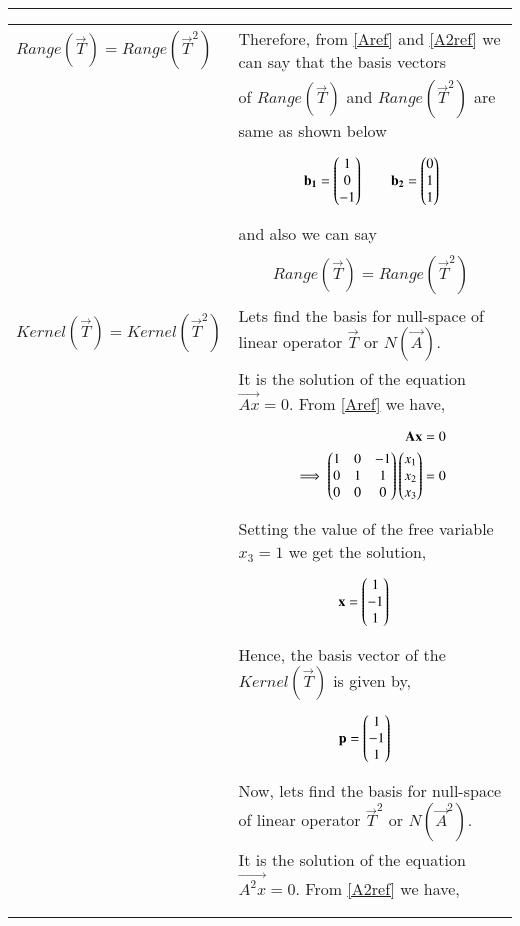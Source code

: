 \documentclass[journal,12pt]{IEEEtran}
\begin{document}
\begin{longtable}{|l|l|}
{\begin{align}
\end{align}}\\
\hline $Range(\vec{T})=Range(\vec{T}^2)$&Therefore, from \eqref{Aref} and \eqref{A2ref} we can say that the basis vectors\\&of $Range(\vec{T})$ and $Range(\vec{T}^2)$ are same as shown below\\&\parbox{12cm}{\begin{align}
    \mathbf{b_1}=\begin{pmatrix}1\\0\\-1\end{pmatrix}\quad\quad\mathbf{b_2}=\begin{pmatrix}0\\1\\1\end{pmatrix}\label{basis}
\end{align}}\\&and also we can say\\&\parbox{12cm}{\begin{align}
    Range(\vec{T})=Range(\vec{T}^2)\label{exp1}
\end{align}}\\
\hline
$Kernel(\vec{T})=Kernel(\vec{T}^2)$&Lets find the basis for null-space of linear operator $\vec{T}$ or $N(\vec{A})$.\\&It is the solution of the equation $\vec{Ax}=0$. From \eqref{Aref} we have,\\&\parbox{12cm}{\begin{align}
\mathbf{Ax} &= 0\\
\implies\begin{pmatrix}1&0&-1\\0&1&1\\0&0&0\end{pmatrix}\begin{pmatrix}x_1\\x_2\\x_3\end{pmatrix} &= 0
\end{align}}\\&Setting the value of the free variable $x_3 = 1$ we get the solution,\\&\parbox{12cm}{
\begin{align}
\mathbf{x} &= \begin{pmatrix}1\\-1\\1\end{pmatrix}
\end{align}}\\&Hence, the basis vector of the $Kernel(\vec{T})$ is given by,\\&\parbox{12cm}{
\begin{align}
\mathbf{p} &= \begin{pmatrix}1\\-1\\1\end{pmatrix}\label{bp1}
\end{align}}\\&Now, lets find the basis for null-space of linear operator $\vec{T}^2$ or $N(\vec{A}^2)$.\\&It is the solution of the equation $\vec{A^2x}=0$. From \eqref{A2ref} we have,\\&\parbox{12cm}{\begin{align}

\end{align}}
\end{longtable}
\end{document}
